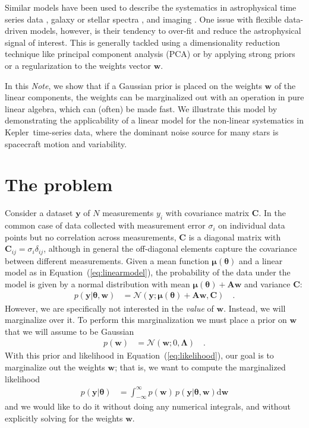 \documentclass[modern]{rnaastex}
\newcommand{\project}[1]{\textsf{#1}}
\newcommand{\kepler}{\project{Kepler}}
\newcommand{\documentname}{\textsl{Note}}
\renewcommand{\eqref}[1]{\ref{eq:#1}}
\newcommand{\Eq}[1]{Equation~(\eqref{#1})}
\newcommand{\eq}[1]{\Eq{#1}}
\newcommand{\eqlabel}[1]{\label{eq:#1}}
\newcommand{\dd}{\ensuremath{ \mathrm{d}}}
\newcommand{\bvec}[1]{{\ensuremath{\boldsymbol{#1}}}}
\newcommand{\Normal}{\ensuremath{\mathcal{N}}}
\newcommand{\mA}{\ensuremath{\bvec{A}}}
\newcommand{\mC}{\ensuremath{\bvec{C}}}
\newcommand{\mL}{\ensuremath{\bvec{\Lambda}}}
\newcommand{\vw}{\ensuremath{\bvec{w}}}
\newcommand{\vy}{\ensuremath{\bvec{y}}}
\newcommand{\vt}{\ensuremath{\bvec{\theta}}}
\newcommand{\vm}{\ensuremath{\bvec{\mu}(\bvec{\theta})}}
\begin{document}
Similar models have been used to describe the systematics in astrophysical time
series data \citep{Smith:2012, Wang:2016, Luger:2016}, galaxy or stellar spectra
\citep{Tsalmantza:2012, Ness:2015}, and imaging \citep{Fergus:2014,
Wang:2017}.
One issue with flexible data-driven models, however, is their tendency to
over-fit and reduce the astrophysical signal of interest.
This is generally tackled using a dimensionality reduction technique like
principal component analysis (PCA) or by applying strong priors or a
regularization to the weights vector $\vw$.

In this \documentname, we show that if a
Gaussian prior is placed on the weights $\vw$ of the linear
components, the weights can be marginalized out with an operation in pure linear
algebra, which can (often) be made fast.
We illustrate this model by demonstrating the applicability of a linear model
for the non-linear systematics in \kepler\ time-series data, where the dominant
noise source for many stars is spacecraft motion and variability.

\section{The problem}

Consider a dataset $\vy$ of $N$ measurements $y_i$ with covariance
matrix $\mC$.
In the common case of data collected with measurement error $\sigma_i$ on
individual data points but no correlation across measurements, $\mC$ is a
diagonal matrix with $\mC_{ij} = \sigma_{i}\delta_{ij}$, although in general
the off-diagonal elements capture the covariance between different
measurements. Given a mean function $\vm$  and a linear model as in
\eq{linearmodel}, the probability of the data under the model is given by a
normal distribution with mean $\vm + \mA \vw$ and variance $\mC$:
%
\begin{align}\eqlabel{likelihood}
p(\vy | \vt, \vw) &= \Normal(\vy; \vm + \mA \vw, \mC) \quad.
\end{align}
%
However, we are specifically not interested in the \emph{value} of $\vw$.
Instead, we will marginalize over it.
To perform this marginalization we must place a prior on $\vw$ that we will
assume to be Gaussian
%
\begin{align}
p(\vw) &= \Normal(\vw; 0, \mL) \quad. \nonumber
\end{align}
%
With this prior and likelihood in \eq{likelihood}, our goal is to marginalize
out the weights $\vw$; that is, we want to compute the marginalized
likelihood
%
\begin{align}
p(\vy | \vt) &= \int_{-\infty}^{\infty} p(\vw)\,p(\vy | \vt, \vw) \dd\vw
\end{align}
and we would like to do it without doing any numerical integrals, and without
explicitly solving for the weights $\vw$.
\end{document}
